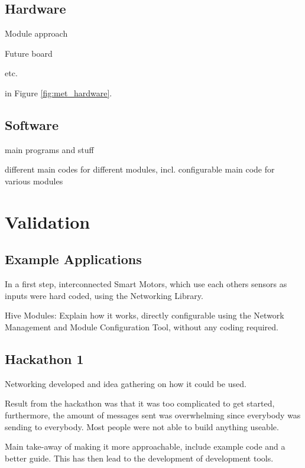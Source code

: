 \subsection{\label{sec:res_hardware}Hardware}

Module approach

Future board

etc.

in Figure \ref{fig:met_hardware}.

\subsection{\label{sec:res_software}Software}

main programs and stuff

different main codes for different modules, incl. configurable main code for various modules 


\section{\label{sec:res_validation}Validation}

\subsection{\label{sec:res_examplekit}Example Applications}

In a first step, interconnected Smart Motors, which use each others sensors as inputs were hard coded, using the Networking Library. 

Hive Modules: Explain how it works, directly configurable using the Network Management and Module Configuration Tool, without any coding required. 

\subsection{\label{sec:res_hackathon1}Hackathon 1}

Networking developed and idea gathering on how it could be used.

Result from the hackathon was that it was too complicated to get started, furthermore, the amount of messages sent was overwhelming since everybody was sending to everybody. Most people were not able to build anything useable. 

Main take-away of making it more approachable, include example code and a better guide. This has then lead to the development of development tools.

